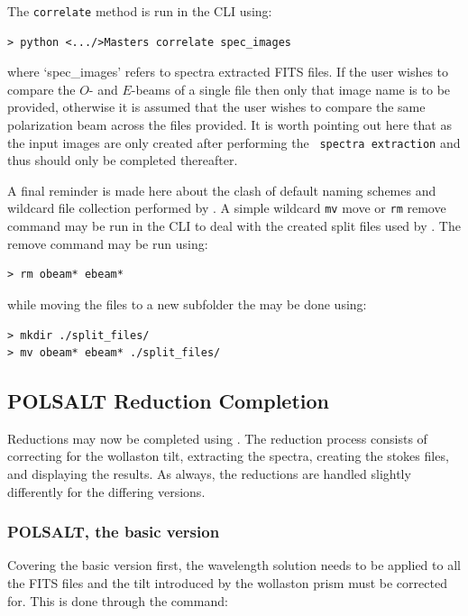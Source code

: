 The \texttt{correlate} method is run in the \gls{CLI} using:

\begin{verbatim}> python <.../>Masters correlate spec_images\end{verbatim}

\noindent where `spec\_images' refers to spectra extracted \gls{FITS} files. If the user wishes to compare the $O$- and $E$-beams of a single file then only that image name is to be provided, otherwise it is assumed that the user wishes to compare the same polarization beam across the files provided. It is worth pointing out here that as the input images are only created after performing the \polsalt\ \texttt{spectra extraction} and thus should only be completed thereafter.
\prgph

A final reminder is made here about the clash of default naming schemes and wildcard file collection performed by \polsalt. A simple wildcard \texttt{mv} move or \texttt{rm} remove command may be run in the \gls{CLI} to deal with the created split files used by \iraf. The remove command may be run using:

\begin{verbatim}> rm obeam* ebeam*\end{verbatim}

\noindent while moving the files to a new subfolder the may be done using:

\begin{verbatim}> mkdir ./split_files/
> mv obeam* ebeam* ./split_files/
\end{verbatim}


\subsection{POLSALT Reduction Completion} \label{subsec:reduc_com}

Reductions may now be completed using \polsalt. The reduction process consists of correcting for the wollaston tilt, extracting the spectra, creating the stokes files, and displaying the results. As always, the reductions are handled slightly differently for the differing versions.

\subsubsection{POLSALT, the basic version}

Covering the basic version first, the wavelength solution needs to be applied to all the \gls{FITS} files and the tilt introduced by the wollaston prism must be corrected for. This is done through the command:

